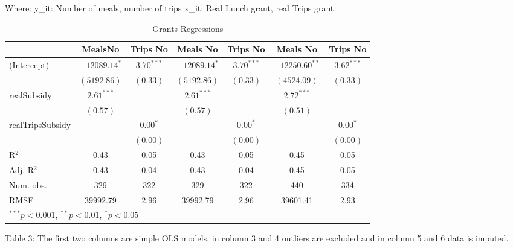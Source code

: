 \documentclass[12pt, a4paper, titlepage]{article}\usepackage[]{graphicx}\usepackage[]{color}
\begin{document}
Where: 
y_{it}: Number of meals, number of trips
x_{it}: Real Lunch grant, real Trips grant


\begin{table}
\begin{center}
\begin{tabular}{l c c c c c c }
\hline
 & MealsNo & Trips No & Meals No & Trips No & Meals No & Trips No \\
\hline
(Intercept)      & $-12089.14^{*}$ & $3.70^{***}$ & $-12089.14^{*}$ & $3.70^{***}$ & $-12250.60^{**}$ & $3.62^{***}$ \\
                 & $(5192.86)$     & $(0.33)$     & $(5192.86)$     & $(0.33)$     & $(4524.09)$      & $(0.33)$     \\
realSubsidy      & $2.61^{***}$    &              & $2.61^{***}$    &              & $2.72^{***}$     &              \\
                 & $(0.57)$        &              & $(0.57)$        &              & $(0.51)$         &              \\
realTripsSubsidy &                 & $0.00^{*}$   &                 & $0.00^{*}$   &                  & $0.00^{*}$   \\
                 &                 & $(0.00)$     &                 & $(0.00)$     &                  & $(0.00)$     \\
\hline
R$^2$            & 0.43            & 0.05         & 0.43            & 0.05         & 0.45             & 0.05         \\
Adj. R$^2$       & 0.43            & 0.04         & 0.43            & 0.04         & 0.45             & 0.05         \\
Num. obs.        & 329             & 322          & 329             & 322          & 440              & 334          \\
RMSE             & 39992.79        & 2.96         & 39992.79        & 2.96         & 39601.41         & 2.93         \\
\hline
\multicolumn{7}{l}{\scriptsize{$^{***}p<0.001$, $^{**}p<0.01$, $^*p<0.05$}}
\end{tabular}
\caption{Grants Regressions}
\label{table:coefficients}
\end{center}
\end{table}

Table 3: The first two columns are simple OLS models, in column 3 and 4 outliers are excluded and in column 5 and 6 data is imputed.  
\end{document}
